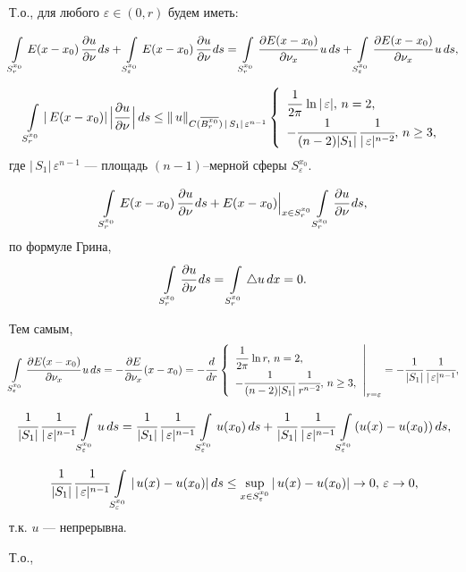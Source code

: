 \documentclass[unicode,12pt,draft]{article}
\begin{document}
Т.о., для любого $\varepsilon\in(0,r)$ будем иметь:

$$\int\limits_{S_r^{x_0}} E(x-x_0)\,\cfrac{\partial
u}{\partial\nu}\,ds+ \int\limits_{S_{\varepsilon}^{x_0}}
E(x-x_0)\,\cfrac{\partial u}{\partial\nu}\,ds=
\int\limits_{S_r^{x_0}} \cfrac{\partial
E(x-x_0)}{\partial\nu_x}\,u\,ds+
\int\limits_{S_{\varepsilon}^{x_0}} \cfrac{\partial
E(x-x_0)}{\partial\nu_x}\,u\,ds,$$

$$\int\limits_{S_r^{x_0}} |\,E(x-x_0)|\,\Bigl|\cfrac{\partial
u}{\partial\nu}\,\Bigr|\,ds\le
\|\,u\|_{C(\overline{B_r^{x_0}})\,|\,S_1|\,\varepsilon^{n-1}}
\left\{%
\begin{array}{ll}
    \cfrac1{2\pi}\,\ln|\,\varepsilon|,\,n=2,      \\
    -\cfrac1{(n-2)|S_1|}\,\cfrac1{|\,\varepsilon|^{n-2}},\,n\ge3, \\
\end{array}%
\right.$$ где $|\,S_1|\,\varepsilon^{n-1}$ --- площадь
$(n-1)$--мерной сферы $S_{\varepsilon}^{x_0}.$

$$\int\limits_{S_r^{x_0}} E(x-x_0)\,\cfrac{\partial
u}{\partial\nu}\,ds+ \Bigl.E(x-x_0) \Bigr|_{x\in S_{r}^{x_0}}
\int\limits_{S_r^{x_0}}\cfrac{\partial u}{\partial\nu}\,ds,$$ по
формуле Грина,
$$\int\limits_{S_r^{x_0}}\cfrac{\partial u}{\partial\nu}\,ds=
\int\limits_{S_r^{x_0}}\triangle u\,dx=0.$$

Тем самым,
$$\int\limits_{S_{\varepsilon}^{x_0}} \cfrac{\partial
E(x-x_0)}{\partial\nu_x}\,u\,ds=-\cfrac{\partial
E}{\partial\nu_x}\,(x-x_0)=-\cfrac d{dr} \left.
\left\{%
\begin{array}{ll}
    \cfrac1{2\pi}\,\ln r,\,n=2,      \\
    -\cfrac1{(n-2)|S_1|}\,\cfrac1{ r^{n-2}},\,n\ge3, \\
\end{array}%
\right.\right|_{r=\varepsilon}=
-\cfrac1{|S_1|}\,\cfrac1{|\,\varepsilon|^{n-1}},$$

$$\cfrac1{|S_1|}\,\cfrac1{|\,\varepsilon|^{n-1}}
\int\limits_{S_{\varepsilon}^{x_0}} u\,ds=
\cfrac1{|S_1|}\,\cfrac1{|\,\varepsilon|^{n-1}}
\int\limits_{S_{\varepsilon}^{x_0}} u(x_0)\,ds+
\cfrac1{|S_1|}\,\cfrac1{|\,\varepsilon|^{n-1}}
\int\limits_{S_{\varepsilon}^{x_0}} (u(x)-u(x_0))\,ds,$$

$$\cfrac1{|S_1|}\,\cfrac1{|\,\varepsilon|^{n-1}}
\int\limits_{S_{\varepsilon}^{x_0}} |\,u(x)-u(x_0)|\,ds\le
\sup_{x\in
S_{\varepsilon}^{x_0}}|\,u(x)-u(x_0)|\to0,\,\varepsilon\to0,$$
т.к. $u$ --- непрерывна.

Т.о.,
\end{document}
